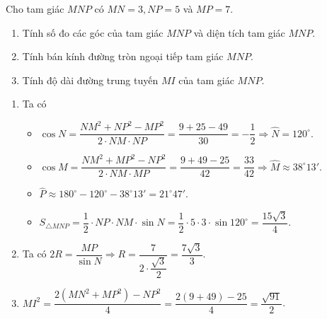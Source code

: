 \begin{bt}%
    Cho tam giác $MNP$ có $MN=3, NP=5$ và $MP=7$.
    \begin{enumerate}
        \item Tính số đo các góc của tam giác $MNP$ và diện tích tam giác $M N P$.
        \item Tính bán kính đường tròn ngoại tiếp tam giác $MNP$.
        \item Tính độ dài đường trung tuyến $MI$ của tam giác $MNP$.
    \end{enumerate}
    \loigiai
    {        \begin{center}           
        \end{center}
          \begin{enumerate}
            \item Ta có
            \begin{itemize}
                \item $\cos N=\dfrac{NM^2+NP^2-MP^2}{2\cdot NM\cdot NP}=\dfrac{9+25-49}{30}=-\dfrac{1}{2}\Rightarrow \widehat{N}=120^\circ$.
                \item $\cos M=\dfrac{NM^2+MP^2-NP^2}{2\cdot NM\cdot MP}=\dfrac{9+49-25}{42}=\dfrac{33}{42}\Rightarrow \widehat{M}\approx 38^\circ13'$.
                \item $\widehat{P}\approx180^\circ - 120^\circ-38^\circ13'=21^\circ47'$.
                \item $S_{\triangle MNP}=\dfrac{1}{2}\cdot NP\cdot NM\cdot \sin N =\dfrac{1}{2}\cdot 5\cdot 3\cdot \sin 120^\circ=\dfrac{15\sqrt{3}}{4}$.
            \end{itemize}
            
            \item Ta có $2R=\dfrac{MP}{\sin N}\Rightarrow R=\dfrac{7}{2\cdot \dfrac{\sqrt{3}}{2}}=\dfrac{7\sqrt{3}}{3}$.
            \item $MI^2=\dfrac{2\left(MN^2+MP^2\right)-NP^2}{4}=\dfrac{2(9+49)-25}{4}=\dfrac{\sqrt{91}}{2}$.
        \end{enumerate}
    }
\end{bt}

